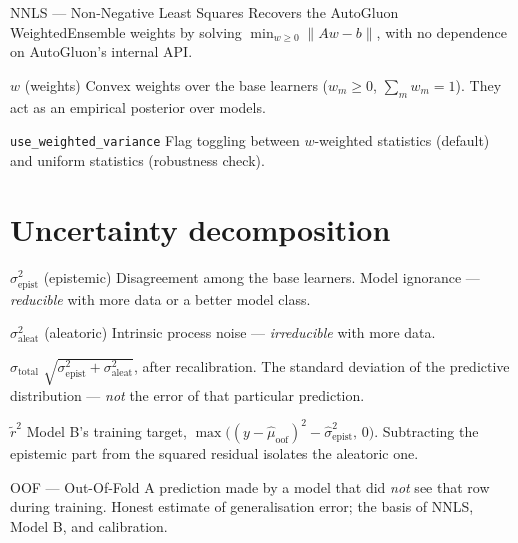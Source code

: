 \documentclass[11pt,a4paper]{article}
\newcommand{\code}[1]{\texttt{\small #1}}
\newenvironment{terms}
  {\begin{description}[style=unboxed,leftmargin=1.2em,itemsep=0.45em,parsep=0pt,
                       font=\normalfont\bfseries]}
  {\end{description}}
\begin{document}
\begin{terms}
  \item[NNLS --- Non-Negative Least Squares] Recovers the AutoGluon
    WeightedEnsemble weights by solving $\min_{w \ge 0}\lVert Aw - b\rVert$,
    with no dependence on AutoGluon's internal API.

  \item[$w$ (weights)] Convex weights over the base learners ($w_m \ge 0$,
    $\sum_m w_m = 1$). They act as an empirical posterior over models.

  \item[\code{use\_weighted\_variance}] Flag toggling between $w$-weighted
    statistics (default) and uniform statistics (robustness check).
\end{terms}

\section{Uncertainty decomposition}

\begin{terms}
  \item[$\sigma^2_{\text{epist}}$ (epistemic)] Disagreement among the base
    learners. Model ignorance --- \emph{reducible} with more data or a better
    model class.

  \item[$\sigma^2_{\text{aleat}}$ (aleatoric)] Intrinsic process noise ---
    \emph{irreducible} with more data.

  \item[$\sigma_{\text{total}}$] $\sqrt{\sigma^2_{\text{epist}} +
    \sigma^2_{\text{aleat}}}$, after recalibration. The standard deviation of
    the predictive distribution --- \emph{not} the error of that particular
    prediction.

  \item[$\tilde r^2$] Model B's training target,
    $\max\!\big((y - \hat\mu_{\text{oof}})^2 - \hat\sigma^2_{\text{epist}},\,0\big)$.
    Subtracting the epistemic part from the squared residual isolates the
    aleatoric one.

  \item[OOF --- Out-Of-Fold] A prediction made by a model that did \emph{not}
    see that row during training. Honest estimate of generalisation error;
    the basis of NNLS, Model B, and calibration.
\end{terms}
\end{document}

